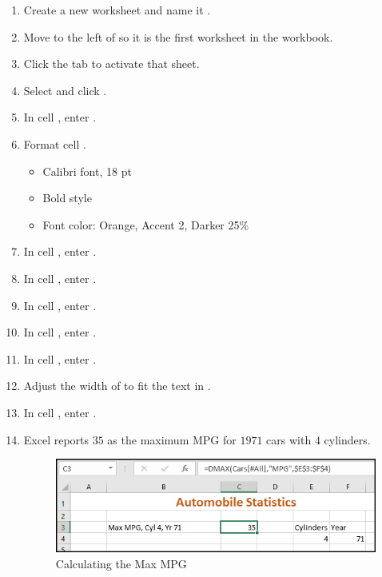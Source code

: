 \begin{enumbox}
	\begin{enumerate}
		\item Create a new worksheet and name it .
		\item Move  to the left of  so it is the first worksheet in the workbook.
		\item Click the  tab to activate that sheet.
		\item Select  and click .
		\item In cell , enter .
		\item Format cell .
		
		\begin{itemize}
			\item Calibri font, 18 pt
			\item Bold style
			\item Font color: Orange, Accent 2, Darker 25\%
		\end{itemize}
		
		\item In cell , enter .
		\item In cell , enter .
		\item In cell , enter .
		\item In cell , enter .
		
		\item In cell , enter .
		\item Adjust the width of  to fit the text in .
		\item In cell , enter .
		\item Excel reports $ 35 $ as the maximum MPG for $ 1971 $ cars with $ 4 $ cylinders.
		
		\begin{figure}[H]
			\centering
			\includegraphics[width=\maxwidth{.95\linewidth}]{gfx/ch09_fig71}
			\caption{Calculating the Max MPG}
			\label{09:fig71}
		\end{figure}
		

\end{enumerate}
\end{enumbox}
